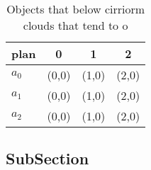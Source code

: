 \documentclass[a4paper]{article}
\begin{document}
\begin{table}
\begin{adjustbox}{width=0.6\columnwidth}
\begin{tabular}{|l|l|l|l|}
\hline
\textbf{plan} & \multicolumn{1}{c|}{\textbf{0}} & \multicolumn{1}{c|}{\textbf{1}} & \multicolumn{1}{c|}{\textbf{2}} \\ \hline
\textbf{$a_0$}  & (0,0) & (1,0) & (2,0) \\ \hline
\textbf{$a_1$}  & (0,0) & (1,0) & (2,0) \\ \hline
\textbf{$a_2$}  & (0,0) & (1,0) & (2,0) \\ \hline
\end{tabular}
\end{adjustbox}
\caption{Objects that below cirriorm clouds that tend to o
}
\end{table}

\subsection{SubSection}
\end{document}
